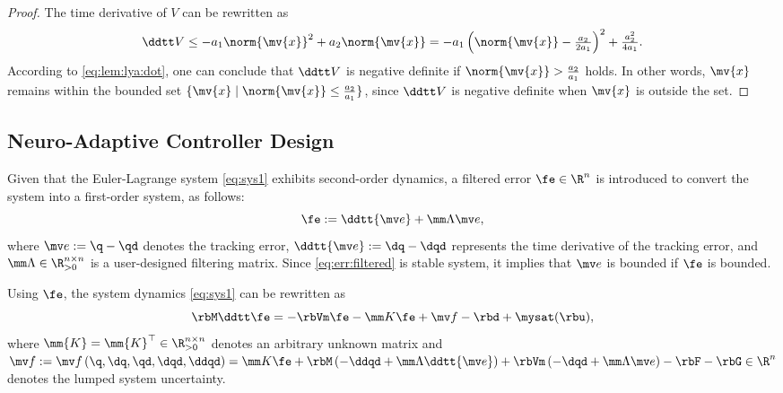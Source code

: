 \documentclass[journal]{IEEEtran}
\begin{document}
\begin{proof}
    The time derivative of $V$ can be rewritten as
    \begin{equation}
        \ddtt V
        \le
        -a_1 \norm{\mv{x}}^2 + a_2 \norm{\mv{x}}
        =
        -a_1
        \left(
            \norm{\mv{x}}-\tfrac{a_2}{2a_1}
        \right)^2
        +
        \tfrac{a_2^2}{4a_1}
        .
        \label{eq:lem:lya:dot}
    \end{equation}
    According to \eqref{eq:lem:lya:dot}, one can conclude that $\ddtt V$ is negative definite if $\norm{\mv{x}}>\tfrac{a_2}{a_1}$ holds.
    In other words, $\mv{x}$ remains within the bounded set $\{\mv{x}\mid\norm{\mv{x}}\le\tfrac{a_2}{a_1}\}$, since $\ddtt V$ is negative definite when $\mv{x}$ is outside the set.
\end{proof}


\subsection{Neuro-Adaptive Controller Design}\label{sec:sub:NAC}

Given that the Euler-Lagrange system \eqref{eq:sys1} exhibits second-order dynamics, a filtered error $\fe\in\R^n$ is introduced to convert the system into a first-order system, as follows:
\begin{equation}
    \fe := \ddtt{\mv e}+\mm\Lambda \mv e
    ,
    \label{eq:err:filtered}
\end{equation}
where $\mv e := \q - \qd$ denotes the tracking error, $\ddtt{\mv e} := \dq - \dqd$ represents the time derivative of the tracking error, and $\mm\Lambda\in\R^{n\times n}_{>0}$ is a user-designed filtering matrix.
Since \eqref{eq:err:filtered} is stable system, it implies that $\mv e$ is bounded if $\fe$ is bounded.

Using $\fe$, the system dynamics \eqref{eq:sys1} can be rewritten as
\begin{equation}
   \rbM \ddtt\fe
    =
    -\rbVm \fe
    -\mm K \fe
    + \mv f
    -\rbd + \mysat(\rbu)
    ,
    \label{eq:sys:filtered}
\end{equation}
where $\mm{K}=\mm{K}^\top\in\R^{n\times n}_{>0}$ denotes an arbitrary unknown matrix and $
    \mv f:= \mv f
    \left(
        \q,\dq,\qd,\dqd,\ddqd
    \right)
    =
    \mm K \fe
    +\rbM
    \left(
        -\ddqd+\mm\Lambda\ddtt{\mv e}
    \right)
    +
    \rbVm
    \left(
        -\dqd+\mm\Lambda\mv e
    \right)
    -
    \rbF
    -
    \rbG
    \in\R^n
$ denotes the lumped system uncertainty.
\end{document}
